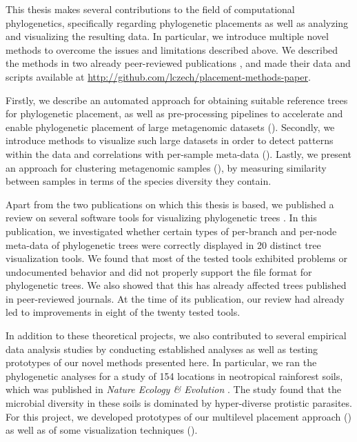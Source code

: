 
This thesis makes several contributions to the field of computational phylogenetics,
specifically regarding phylogenetic placements as well as analyzing and visualizing the resulting data.
In particular, we introduce multiple novel methods to overcome the issues and limitations described above.
We described the methods in two already peer-reviewed publications \cite{Czech2018,Czech2018a},
and made their data and scripts available at \url{http://github.com/lczech/placement-methods-paper}.


Firstly, we describe an automated approach for obtaining suitable reference trees for phylogenetic placement,
as well as pre-processing pipelines to accelerate and enable
phylogenetic placement of large metagenomic datasets ().
Secondly, we introduce methods to visualize such large datasets
in order to detect patterns within the data and correlations with per-sample meta-data ().
Lastly, we present an approach for clustering metagenomic samples (),
by measuring similarity between samples in terms of the species diversity they contain.

Apart from the two publications on which this thesis is based,
we published a review on several software tools for visualizing phylogenetic trees \cite{Czech2017}.
In this publication, we investigated whether certain types of per-branch and per-node meta-data of phylogenetic trees
were correctly displayed in \num{20} distinct tree visualization tools.
We found that most of the tested tools exhibited problems or undocumented behavior and
did not properly support the  file format for phylogenetic trees.
We also showed that this has already affected trees published in peer-reviewed journals.
At the time of its publication, our review had already led to improvements in eight of the twenty tested tools.

In addition to these theoretical projects, we also contributed to several empirical data analysis studies
by conducting established analyses as well as testing prototypes of our novel methods presented here.
In particular, we ran the phylogenetic analyses for a study of \num{154} locations
in neotropical rainforest soils, which was published in \textit{Nature Ecology \& Evolution} \cite{Mahe2017}.
The study found that the microbial diversity in these soils is dominated by hyper-diverse protistic parasites.
For this project, we developed prototypes of our multilevel placement approach
()
as well as of some visualization techniques ().

